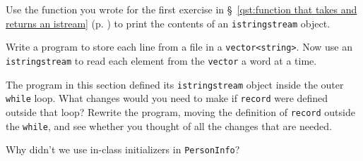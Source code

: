 %
%
\begin{question}
Use the function you wrote for the first exercise in \S~\ref{qst:function that takes and returns an istream} (p. \pageref{qst:function that takes and returns an istream}) to print the contents of an \verb|istringstream| object.
\end{question}

\begin{question}
Write a program to store each line from a file in a
\verb|vector<string>|. Now use an \verb|istringstream| to read each element from
the \verb|vector| a word at a time.
\end{question}

\begin{question}
The program in this section defined its \verb|istringstream|
object inside the outer \verb|while| loop. What changes would you need to make if
\verb|record| were defined outside that loop? Rewrite the program, moving the
definition of \verb|record| outside the \verb|while|, and see whether you thought of all
the changes that are needed.
\end{question}

\begin{question}
Why didn’t we use in-class initializers in \verb|PersonInfo|?
\end{question}
